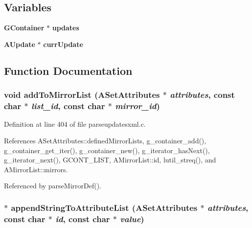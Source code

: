 \subsection*{Variables}
\begin{CompactItemize}
\item 
{\bf GContainer} $\ast$ {\bf updates}
\item 
{\bf AUpdate} $\ast$ {\bf curr\-Update}
\end{CompactItemize}


\subsection{Function Documentation}
\subsubsection{\setlength{\rightskip}{0pt plus 5cm}void add\-To\-Mirror\-List ({\bf ASet\-Attributes} $\ast$ {\em attributes}, const char $\ast$ {\em list\_\-id}, const char $\ast$ {\em mirror\_\-id})\hspace{0.3cm}{\tt  [static]}}\label{parseupdatesxml_8c_a9}




Definition at line 404 of file parseupdatesxml.c.

References ASet\-Attributes::defined\-Mirror\-Lists, g\_\-container\_\-add(), g\_\-container\_\-get\_\-iter(), g\_\-container\_\-new(), g\_\-iterator\_\-has\-Next(), g\_\-iterator\_\-next(), GCONT\_\-LIST, AMirror\-List::id, lutil\_\-streq(), and AMirror\-List::mirrors.

Referenced by parse\-Mirror\-Def().
\subsubsection{ $\ast$ append\-String\-To\-Attribute\-List ({\bf ASet\-Attributes} $\ast$ {\em attributes}, const char $\ast$ {\em id}, const char $\ast$ {\em value})\hspace{0.3cm}{\tt  [static]}}\label{parseupdatesxml_8c_a21}




